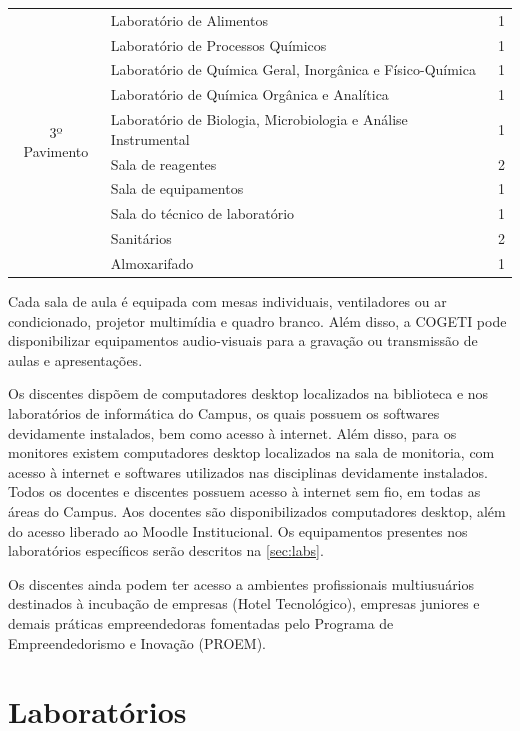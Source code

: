 \begin{quadro}
\begin{tabularx}{\textwidth}{c >{\centering\arraybackslash}X  c}
        \multirow{10}{*}{ 3º Pavimento } & Laboratório de Alimentos & 1 \\
        & Laboratório de Processos Químicos & 1 \\
        & Laboratório de Química Geral, Inorgânica e Físico-Química & 1 \\
        & Laboratório de Química Orgânica e Analítica & 1 \\
        & Laboratório de Biologia, Microbiologia e Análise Instrumental & 1 \\
        & Sala de reagentes & 2 \\
        & Sala de equipamentos & 1 \\
        & Sala do técnico de laboratório & 1 \\
        & Sanitários & 2 \\
        & Almoxarifado & 1 \\ \bottomrule

        \end{tabularx}
    \label{qua:blocoa}
\end{quadro}

Cada sala de aula é equipada com mesas individuais, ventiladores ou ar condicionado, projetor multimídia e quadro branco. Além disso, a COGETI pode disponibilizar equipamentos audio-visuais para a gravação ou transmissão de aulas e apresentações.

Os discentes dispõem de computadores desktop localizados na biblioteca e nos laboratórios de informática do Campus, os quais possuem os softwares devidamente instalados, bem como acesso à internet. Além disso, para os monitores existem computadores desktop localizados na sala de monitoria, com acesso à internet e softwares utilizados nas disciplinas devidamente instalados. Todos os docentes e discentes possuem acesso à internet sem fio, em todas as áreas do Campus. Aos docentes são disponibilizados computadores desktop, além do acesso liberado ao Moodle Institucional. Os equipamentos presentes nos laboratórios específicos serão descritos na \autoref{sec:labs}.

Os discentes ainda podem ter acesso a ambientes profissionais multiusuários destinados à incubação de empresas (Hotel Tecnológico), empresas juniores e demais práticas empreendedoras fomentadas pelo Programa de Empreendedorismo e Inovação (PROEM).

\section{Laboratórios}
\label{sec:labs}

